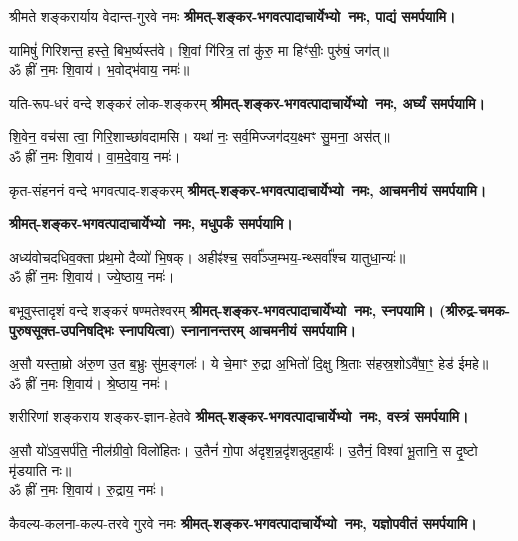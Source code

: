 \begin{center}
{श्रीमते शङ्करार्याय वेदान्त-गुरवे नमः}
\textbf{श्रीमत्-शङ्कर-भगवत्पादाचार्येभ्यो~नमः, पाद्यं समर्पयामि।}
\medskip

यामिषुं॑ गिरिशन्त॒ हस्ते॒ बिभ॒र्ष्यस्त॑वे। शि॒वां गि॑रित्र॒ तां कु॑रु॒ मा हिꣳ॑सीः॒ पुरु॑षं॒ जग॑त्॥\\
ॐ ह्रीं न॒मः शि॒वाय॑। भ॒वोद्भ॑वाय॒ नमः॑॥

{यति-रूप-धरं वन्दे शङ्करं लोक-शङ्करम्}
\textbf{श्रीमत्-शङ्कर-भगवत्पादाचार्येभ्यो~नमः, अर्घ्यं समर्पयामि।}
\medskip

शि॒वेन॒ वच॑सा त्वा॒ गिरि॒शाच्छा॑वदामसि। यथा॑ नः॒ सर्व॒मिज्जग॑दय॒क्ष्मꣳ सु॒मना॒ अस॑त्॥\\
ॐ ह्रीं न॒मः शि॒वाय॑। वा॒म॒दे॒वाय॒ नमः॑।

{कृत-संहननं वन्दे भगवत्पाद-शङ्करम्}
\textbf{श्रीमत्-शङ्कर-भगवत्पादाचार्येभ्यो~नमः, आचमनीयं समर्पयामि।}
\medskip

\textbf{श्रीमत्-शङ्कर-भगवत्पादाचार्येभ्यो~नमः, मधुपर्कं समर्पयामि।}
\medskip

अध्य॑वोचदधिव॒क्ता प्र॑थ॒मो दैव्यो॑ भि॒षक्। अहीꣴ॑श्च॒ सर्वा᳚ञ्ज॒म्भय॒-न्थ्सर्वा᳚श्च यातुधा॒न्यः॑॥\\
ॐ ह्रीं न॒मः शि॒वाय॑। ज्ये॒ष्ठाय॒ नमः॑।

{बभूवुस्तादृशं वन्दे शङ्करं षण्मतेश्वरम्}
\textbf{श्रीमत्-शङ्कर-भगवत्पादाचार्येभ्यो~नमः, स्नपयामि। (श्रीरुद्र-चमक-पुरुषसूक्त-उपनिषद्भिः स्नापयित्वा) स्नानानन्तरम् आचमनीयं समर्पयामि।}
\medskip

अ॒सौ यस्ता॒म्रो अ॑रु॒ण उ॒त ब॒भ्रुः सु॑म॒ङ्गलः॑। ये चे॒माꣳ रु॒द्रा अ॒भितो॑ दि॒क्षु श्रि॒ताः स॑हस्र॒शोऽवै॑षा॒ꣳ॒ हेड॑ ईमहे॥\\
ॐ ह्रीं न॒मः शि॒वाय॑। श्रे॒ष्ठाय॒ नमः॑।

{शरीरिणां शङ्कराय शङ्कर-ज्ञान-हेतवे}
\textbf{श्रीमत्-शङ्कर-भगवत्पादाचार्येभ्यो~नमः, वस्त्रं समर्पयामि।}
\medskip

अ॒सौ यो॑ऽव॒सर्प॑ति॒ नील॑ग्रीवो॒ विलो॑हितः। उ॒तैनं॑ गो॒पा अ॑दृश॒न्न॒दृ॑शन्नुदहा॒र्यः॑। उ॒तैनं॒ विश्वा॑ भू॒तानि॒ स दृ॒ष्टो मृ॑डयाति नः॥\\
ॐ ह्रीं न॒मः शि॒वाय॑। रु॒द्राय॒ नमः॑।

{कैवल्य-कलना-कल्प-तरवे गुरवे नमः}
\textbf{श्रीमत्-शङ्कर-भगवत्पादाचार्येभ्यो~नमः, यज्ञोपवीतं समर्पयामि।}
\medskip


\end{center}
